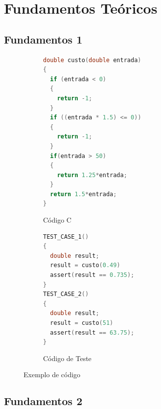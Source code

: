 \section{Fundamentos Teóricos}
\label{sec:fundamentos}



\subsection{Fundamentos 1}
\label{sec:fundamentos1}

\begin{figure}[thp]	
    \centering
    \begin{subfigure}{0.4\textwidth}
    \centering
    \begin{lstlisting}[language=C]       
double custo(double entrada)
{
  if (entrada < 0) 
  {
    return -1;
  }
  if ((entrada * 1.5) <= 0)) 
  {
    return -1;
  }
  if(entrada > 50) 
  {
    return 1.25*entrada;
  }
  return 1.5*entrada;
}
	\end{lstlisting}
    \caption{Código C}
  \end{subfigure}%
  \begin{subfigure}{.05\textwidth}
    \hfill
  \end{subfigure}%
  \begin{subfigure}{.4\textwidth}
    \centering
\begin{lstlisting}[language=C]   
TEST_CASE_1()
{
  double result;
  result = custo(0.49)
  assert(result == 0.735);
}
TEST_CASE_2()
{
  double result;
  result = custo(51)
  assert(result == 63.75);
}
\end{lstlisting}
  \caption{Código de Teste}
  \end{subfigure}%
  \caption{\label{fig:program_test} Exemplo de código}
\end{figure}


\subsection{Fundamentos 2}
\label{sec:fundamentos2}

